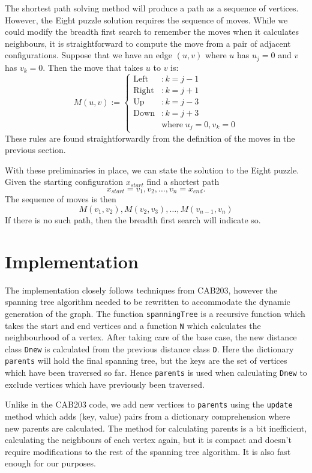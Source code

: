 \documentclass[a4paper]{article}
\begin{document}
The shortest path solving method will produce a path as a sequence of vertices.  However, the Eight puzzle solution requires the sequence of moves.  While we could modify the breadth first search to remember the moves when it calculates neighbours, it is straightforward to compute the move from a pair of adjacent configurations.  Suppose that we have an edge $(u,v)$ where $u$ has $u_j = 0$ and $v$ has $v_k = 0$.  Then the move that takes $u$ to $v$ is:
\[
   M(u,v) := 
   \begin{cases} 
      \text{Left}  & : k = j - 1 \\
      \text{Right} & : k = j + 1 \\
      \text{Up}    & : k = j - 3 \\
      \text{Down}  & : k = j + 3 \\
      & \text{where} \; u_j = 0, v_k = 0
   \end{cases}
\]
These rules are found straightforwardly from the definition of the moves in the previous section.

With these preliminaries in place, we can state the solution to the Eight puzzle.  Given the starting configuration $x_{start}$ find a shortest path 
\[
   x_{start} =  v_1, v_2, \ldots, v_n = x_{end}.
\]   
   The sequence of moves is then 
\[
   M(v_1, v_2), M(v_2, v_3), \ldots, M(v_{n-1}, v_n)
\]
If there is no such path, then the breadth first search will indicate so.

\section{Implementation}
The implementation closely follows techniques from CAB203, however the spanning tree algorithm needed to be rewritten to accommodate the dynamic generation of the graph.  The function \verb+spanningTree+ is a recursive function which takes the start and end vertices and a function \verb+N+ which calculates the neighbourhood of a vertex.  After taking care of the base case, the new distance class \verb+Dnew+ is calculated from the previous distance class \verb+D+.  Here the dictionary \verb+parents+ will hold the final spanning tree, but the keys are the set of vertices which have been traversed so far.  Hence \verb+parents+ is used when calculating \verb+Dnew+ to exclude vertices which have previously been traversed.

Unlike in the CAB203 code, we add new vertices to \verb+parents+ using the \verb+update+ method which adds (key, value) pairs from a dictionary comprehension where new parents are calculated.  The method for calculating parents is a bit inefficient, calculating the neighbours of each vertex again, but it is compact and doesn't require modifications to the rest of the spanning tree algorithm.  It is also fast enough for our purposes.
\end{document}

